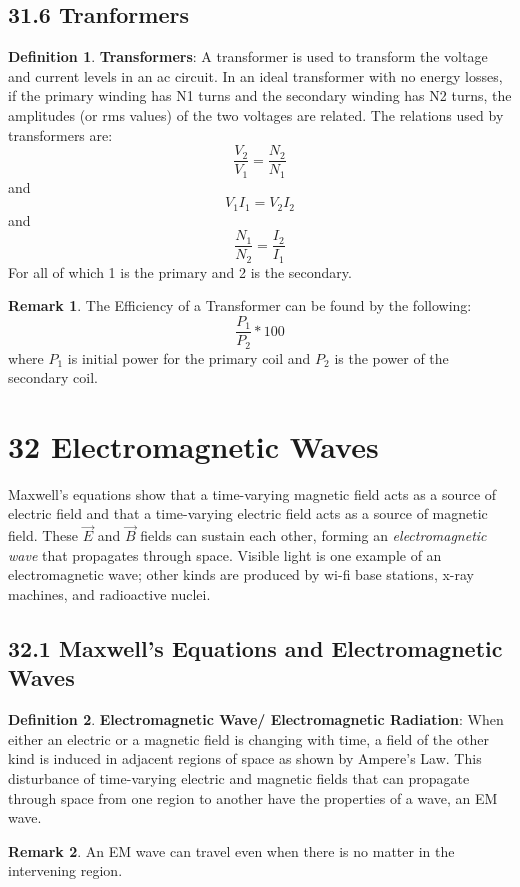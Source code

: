 \documentclass[12pt]{amsart}
\theoremstyle{definition}
\newtheorem{definition}{Definition} %
\newtheorem*{remark}{Remark}        %
\numberwithin{equation}{theorem}    %
\begin{document}
\subsection*{31.6 Tranformers}

    \begin{definition}
        \textbf{Transformers}:
        A transformer is used to transform the voltage and current levels in an ac circuit. In an ideal transformer with no energy losses, if the primary winding has N1 turns and the secondary winding has N2 turns, the amplitudes (or rms values) of the two voltages are related.
        The relations used by transformers are:
        $$\frac{V_2}{V_1} = \frac{N_2}{N_1}$$
        and
        $$V_1I_1 = V_2I_2$$
        and
        $$\frac{N_1}{N_2} = \frac{I_2}{I_1}$$
        For all of which 1 is the primary and 2 is the secondary.
        \begin{remark}
            The Efficiency of a Transformer can be found by the following:
            $$\frac{P_1}{P_2} * 100$$ where $P_1$ is initial power for the
            primary coil and $P_2$ is the power of the secondary coil.
        
        \end{remark}
    \end{definition}


\section*{32 Electromagnetic Waves}
Maxwell’s equations show that a time-varying magnetic field acts as a source of electric field and that a time-varying electric field acts as a source of magnetic field. These $\vec{E}$ and $\vec{B}$ fields can sustain each other, forming an \textit{electromagnetic wave} that propagates through space. Visible light is one example of an electromagnetic wave; other kinds are produced by wi-fi base stations, x-ray machines, and radioactive nuclei.

\subsection*{32.1 Maxwell's Equations and Electromagnetic Waves}

\begin{definition}
    \textbf{Electromagnetic Wave/ Electromagnetic Radiation}:
    When either an electric or a magnetic field is changing with time, a field of the other kind is induced in adjacent regions of space as shown by Ampere's Law. This disturbance of time-varying electric and magnetic fields that can propagate through space from one region to another have the properties of a wave, an EM wave.
    \begin{remark}
        An EM wave can travel even when there is no matter in the intervening region.
    \end{remark}
\end{definition}
\end{document}

